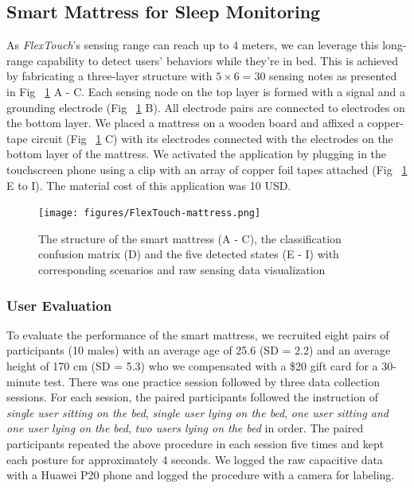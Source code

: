\subsection{Smart Mattress for Sleep Monitoring}
As \textit{FlexTouch}'s sensing range can reach up to 4 meters, we can leverage this long-range capability to detect users' behaviors while they're in bed. This is achieved by fabricating a three-layer structure with $5 \times 6 = 30$ sensing notes as presented in Fig ~\ref{fig:smartmattress} A - C. Each sensing node on the top layer is formed with a signal and a grounding electrode (Fig ~\ref{fig:smartmattress} B). All electrode pairs are connected to electrodes on the bottom layer. We placed a mattress on a wooden board and affixed a copper-tape circuit (Fig ~\ref{fig:smartmattress} C) with its electrodes connected with the electrodes on the bottom layer of the mattress. We activated the application by plugging in the touchscreen phone using a clip with an array of copper foil tapes attached (Fig ~\ref{fig:smartmattress} E to I). The material cost of this application was 10 USD.

\begin{figure}[ht]
  \centering
    \texttt{[image: figures/FlexTouch-mattress.png]}
    \setlength{\belowcaptionskip}{-6pt}
    \caption{The structure of the smart mattress (A - C), the classification confusion matrix (D)  and the five detected states (E - I) with corresponding scenarios and raw sensing data visualization}
    \label{fig:smartmattress}
  \end{figure}

\subsubsection{User Evaluation}
To evaluate the performance of the smart mattress, we recruited eight pairs of participants (10 males) with an average age of 25.6 (SD = 2.2) and an average height of 170 cm (SD = 5.3) who we compensated with a \$20 gift card for a 30-minute test. There was one practice session followed by three data collection sessions. For each session, the paired participants followed the instruction of \textit{single user sitting on the bed}, \textit{single user lying on the bed}, \textit{one user sitting and one user lying on the bed}, \textit{two users lying on the bed} in order. The paired participants repeated the above procedure in each session five times and kept each posture for approximately 4 seconds. We logged the raw capacitive data with a Huawei P20 phone and logged the procedure with a camera for labeling. 

